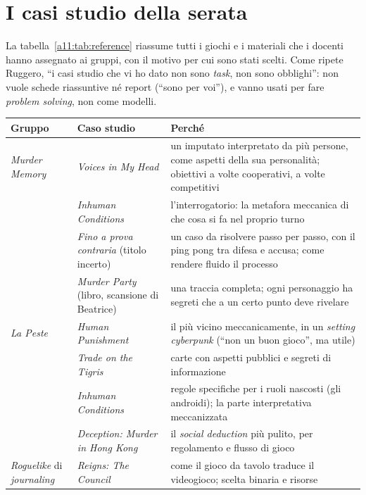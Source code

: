 \section{I casi studio della serata}
\label{a11:sec:reference}

La tabella~\ref{a11:tab:reference} riassume tutti i giochi e i materiali che i docenti
hanno assegnato ai gruppi, con il motivo per cui sono stati scelti. Come ripete Ruggero,
``i casi studio che vi ho dato non sono \emph{task}, non sono obblighi'': non vuole schede
riassuntive né report (``sono per voi''), e vanno usati per fare \emph{problem solving},
non come modelli.

\begin{table}[htbp]
\centering
\small
\begin{tabular}{@{}p{2.1cm}p{3.6cm}p{7.6cm}@{}}
\toprule
\textbf{Gruppo} & \textbf{Caso studio} & \textbf{Perché} \\
\midrule
\emph{Murder Memory} & \emph{Voices in My Head} & un imputato interpretato da più
persone, come aspetti della sua personalità; obiettivi a volte cooperativi, a volte
competitivi \\
 & \emph{Inhuman Conditions} & l'interrogatorio: la metafora meccanica di che cosa si fa
nel proprio turno \\
 & \emph{Fino a prova contraria} (titolo incerto) & un caso da risolvere passo per passo,
con il ping pong tra difesa e accusa; come rendere fluido il processo \\
 & \emph{Murder Party} (libro, scansione di Beatrice) & una traccia completa; ogni
personaggio ha segreti che a un certo punto deve rivelare \\
\midrule
\emph{La Peste} & \emph{Human Punishment} & il più vicino meccanicamente, in un
\emph{setting} \emph{cyberpunk} (``non un buon gioco'', ma utile) \\
 & \emph{Trade on the Tigris} & carte con aspetti pubblici e segreti di informazione \\
 & \emph{Inhuman Conditions} & regole specifiche per i ruoli nascosti (gli androidi); la
parte interpretativa meccanizzata \\
 & \emph{Deception: Murder in Hong Kong} & il \emph{social deduction} più pulito, per
regolamento e flusso di gioco \\
\midrule
\emph{Roguelike} di \emph{journaling} & \emph{Reigns: The Council} & come il gioco da
tavolo traduce il videogioco; scelta binaria e risorse \\

\end{tabular}
\end{table}
